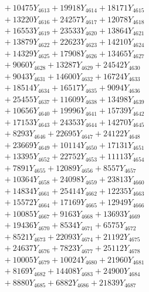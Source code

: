 \documentclass[a4paper,10pt]{article}
\begin{document}
{\begin{align}
&\;  + 10475 Y_{4613} + 19918 Y_{4614} + 18171 Y_{4615} \\[0.3ex]
&\;  + 13220 Y_{4616} + 24257 Y_{4617} + 12078 Y_{4618} \\[0.5ex]\allowbreak
&\;  + 16553 Y_{4619} + 23533 Y_{4620} + 13864 Y_{4621} \\[0.3ex]
&\;  + 13879 Y_{4622} + 22623 Y_{4623} + 14210 Y_{4624} \\[0.3ex]
&\;  + 14329 Y_{4625} + 17908 Y_{4626} + 13465 Y_{4627} \\[0.3ex]
&\;  + 9060 Y_{4628} + 13287 Y_{4629} + 24542 Y_{4630} \\[0.3ex]
&\;  + 9043 Y_{4631} + 14600 Y_{4632} + 16724 Y_{4633} \\[0.3ex]
&\;  + 18514 Y_{4634} + 16517 Y_{4635} + 9094 Y_{4636} \\[0.3ex]
&\;  + 25455 Y_{4637} + 11609 Y_{4638} + 13498 Y_{4639} \\[0.3ex]
&\;  + 10656 Y_{4640} + 19996 Y_{4641} + 15739 Y_{4642} \\[0.3ex]
&\;  + 17153 Y_{4643} + 24353 Y_{4644} + 14270 Y_{4645} \\[0.3ex]
&\;  + 8293 Y_{4646} + 22695 Y_{4647} + 24122 Y_{4648} \\[0.5ex]\allowbreak
&\;  + 23669 Y_{4649} + 10114 Y_{4650} + 17131 Y_{4651} \\[0.3ex]
&\;  + 13395 Y_{4652} + 22752 Y_{4653} + 11113 Y_{4654} \\[0.3ex]
&\;  + 7891 Y_{4655} + 12089 Y_{4656} + 8557 Y_{4657} \\[0.3ex]
&\;  + 10364 Y_{4658} + 24098 Y_{4659} + 23813 Y_{4660} \\[0.3ex]
&\;  + 14834 Y_{4661} + 25414 Y_{4662} + 12235 Y_{4663} \\[0.3ex]
&\;  + 15572 Y_{4664} + 17169 Y_{4665} + 12949 Y_{4666} \\[0.3ex]
&\;  + 10085 Y_{4667} + 9163 Y_{4668} + 13693 Y_{4669} \\[0.3ex]
&\;  + 19436 Y_{4670} + 8534 Y_{4671} + 6575 Y_{4672} \\[0.3ex]
&\;  + 8521 Y_{4673} + 22093 Y_{4674} + 21192 Y_{4675} \\[0.3ex]
&\;  + 24637 Y_{4676} + 7823 Y_{4677} + 25112 Y_{4678} \\[0.5ex]\allowbreak
&\;  + 10005 Y_{4679} + 10024 Y_{4680} + 21960 Y_{4681} \\[0.3ex]
&\;  + 8169 Y_{4682} + 14408 Y_{4683} + 24900 Y_{4684} \\[0.3ex]
&\;  + 8880 Y_{4685} + 6882 Y_{4686} + 21839 Y_{4687} \\[0.3ex]

\end{align}}
\end{document}
